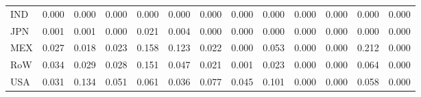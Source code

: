 \begin{table}[htbp]
\begin{tabular}{lcccccccccccc}
  IND & \textcolor[RGB]{255,165,0}{0.000} & \textcolor[RGB]{255,165,0}{0.000} & \textcolor[RGB]{255,165,0}{0.000} & \textcolor[RGB]{255,165,0}{0.000} & \textcolor[RGB]{255,165,0}{0.000} & \textcolor[RGB]{255,165,0}{0.000} & \textcolor[RGB]{255,165,0}{0.000} & \textcolor[RGB]{255,165,0}{0.000} & \textcolor[RGB]{255,165,0}{0.000} & \textcolor[RGB]{255,165,0}{0.000} & \textcolor[RGB]{255,165,0}{0.000} & \textcolor[RGB]{255,165,0}{0.000} \\ 
  JPN & \textcolor[RGB]{125,81,130}{0.001} & \textcolor[RGB]{128,82,128}{0.001} & \textcolor[RGB]{255,165,0}{0.000} & \textcolor[RGB]{96,62,159}{0.021} & \textcolor[RGB]{117,76,138}{0.004} & \textcolor[RGB]{255,165,0}{0.000} & \textcolor[RGB]{255,165,0}{0.000} & \textcolor[RGB]{255,165,0}{0.000} & \textcolor[RGB]{255,165,0}{0.000} & \textcolor[RGB]{255,165,0}{0.000} & \textcolor[RGB]{255,165,0}{0.000} & \textcolor[RGB]{255,165,0}{0.000} \\ 
  MEX & \textcolor[RGB]{81,52,174}{0.027} & \textcolor[RGB]{102,66,153}{0.018} & \textcolor[RGB]{91,59,164}{0.023} & \textcolor[RGB]{4,3,251}{0.158} & \textcolor[RGB]{17,11,238}{0.123} & \textcolor[RGB]{94,61,162}{0.022} & \textcolor[RGB]{255,165,0}{0.000} & \textcolor[RGB]{47,30,208}{0.053} & \textcolor[RGB]{255,165,0}{0.000} & \textcolor[RGB]{255,165,0}{0.000} & \textcolor[RGB]{2,1,253}{0.212} & \textcolor[RGB]{255,165,0}{0.000} \\ 
  RoW & \textcolor[RGB]{66,43,189}{0.034} & \textcolor[RGB]{77,50,178}{0.029} & \textcolor[RGB]{79,51,176}{0.028} & \textcolor[RGB]{6,4,249}{0.151} & \textcolor[RGB]{57,37,198}{0.047} & \textcolor[RGB]{98,63,157}{0.021} & \textcolor[RGB]{123,80,132}{0.001} & \textcolor[RGB]{89,58,166}{0.023} & \textcolor[RGB]{255,165,0}{0.000} & \textcolor[RGB]{255,165,0}{0.000} & \textcolor[RGB]{38,25,217}{0.064} & \textcolor[RGB]{255,165,0}{0.000} \\ 
  USA & \textcolor[RGB]{70,45,185}{0.031} & \textcolor[RGB]{13,8,242}{0.134} & \textcolor[RGB]{51,33,204}{0.051} & \textcolor[RGB]{40,26,215}{0.061} & \textcolor[RGB]{64,41,191}{0.036} & \textcolor[RGB]{30,19,225}{0.077} & \textcolor[RGB]{59,38,196}{0.045} & \textcolor[RGB]{25,16,230}{0.101} & \textcolor[RGB]{255,165,0}{0.000} & \textcolor[RGB]{255,165,0}{0.000} & \textcolor[RGB]{42,27,212}{0.058} & \textcolor[RGB]{255,165,0}{0.000} \\ 
   \hline
\end{tabular}
\end{table}
